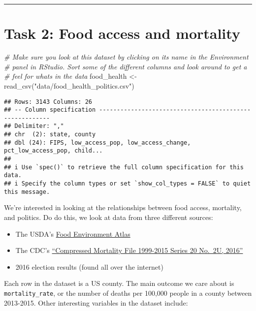 \documentclass[
]{article}
\newenvironment{Shaded}{\begin{snugshade}}{\end{snugshade}}
\newcommand{\CommentTok}[1]{\textcolor[rgb]{0.56,0.35,0.01}{\textit{#1}}}
\newcommand{\FunctionTok}[1]{\textcolor[rgb]{0.00,0.00,0.00}{#1}}
\newcommand{\NormalTok}[1]{#1}
\newcommand{\OtherTok}[1]{\textcolor[rgb]{0.56,0.35,0.01}{#1}}
\newcommand{\StringTok}[1]{\textcolor[rgb]{0.31,0.60,0.02}{#1}}
\providecommand{\tightlist}{%
  \setlength{\itemsep}{0pt}\setlength{\parskip}{0pt}}
\begin{document}
\begin{center}\rule{0.5\linewidth}{0.5pt}\end{center}

\hypertarget{task-2-food-access-and-mortality}{%
\section{Task 2: Food access and
mortality}\label{task-2-food-access-and-mortality}}

\begin{Shaded}
\begin{Highlighting}[]
\CommentTok{\# Make sure you look at this dataset by clicking on its name in the Environment}
\CommentTok{\# panel in RStudio. Sort some of the different columns and look around to get a}
\CommentTok{\# feel for what\textquotesingle{}s in the data}
\NormalTok{food\_health }\OtherTok{\textless{}{-}} \FunctionTok{read\_csv}\NormalTok{(}\StringTok{"data/food\_health\_politics.csv"}\NormalTok{) }
\end{Highlighting}
\end{Shaded}

\begin{verbatim}
## Rows: 3143 Columns: 26
## -- Column specification --------------------------------------------------------
## Delimiter: ","
## chr  (2): state, county
## dbl (24): FIPS, low_access_pop, low_access_change, pct_low_access_pop, child...
## 
## i Use `spec()` to retrieve the full column specification for this data.
## i Specify the column types or set `show_col_types = FALSE` to quiet this message.
\end{verbatim}

We're interested in looking at the relationships between food access,
mortality, and politics. Do do this, we look at data from three
different sources:

\begin{itemize}
\tightlist
\item
  The USDA's
  \href{https://www.ers.usda.gov/data-products/food-environment-atlas/documentation/}{Food
  Environment Atlas}
\item
  The CDC's \href{http://wonder.cdc.gov/cmf-icd10.html}{``Compressed
  Mortality File 1999-2015 Series 20 No.~2U, 2016''}
\item
  2016 election results (found all over the internet)
\end{itemize}

Each row in the dataset is a US county. The main outcome we care about
is \texttt{mortality\_rate}, or the number of deaths per 100,000 people
in a county between 2013-2015. Other interesting variables in the
dataset include:
\end{document}
